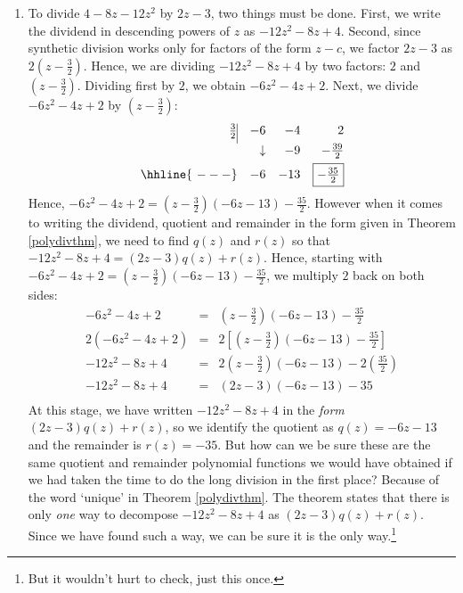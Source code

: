 \documentclass{ximera}
\begin{document}
\begin{exampleSol}
\begin{enumerate}
        \item To divide $4-8z-12z^2$ by $2z-3$, two things must be done.  First, we write the dividend in descending powers of $z$ as $-12z^2-8z+4$.  Second, since synthetic division works only for factors of the form $z-c$, we factor $2z-3$ as $2\left(z-\frac{3}{2}\right)$.  Hence, we are dividing  $-12z^2-8z+4$ by two factors:  $2$ and $\left(z-\frac{3}{2}\right)$.  Dividing first by $2$, we obtain $-6z^2-4z+2$.  Next, we divide  $-6z^2-4z+2$ by $\left(z-\frac{3}{2}\right)$:
            \[ 
                \begin{array}{rrrr}
                    \frac{3}{2}   \vline& -6 & -4 & 2   \\ [4pt]
                    & \downarrow &  -9  & -\frac{39}{2}  \\ [4pt] \hhline{~---} 
                    &  -6  &   -13  & \fbox{$-\frac{35}{2}$}  \\  
                \end{array}
            \]
            Hence,  $-6z^2-4z+2 = \left(z-\frac{3}{2}\right)(-6 z - 13) - \frac{35}{2}$.  However when it comes to writing  the dividend, quotient and remainder in the form given in Theorem \ref{polydivthm}, we need to find $q(z)$ and $r(z)$ so that  $-12z^2-8z+4 = (2z-3) q(z) + r(z)$. Hence, starting with $-6z^2-4z+2 = \left(z-\frac{3}{2}\right)(-6 z - 13) - \frac{35}{2}$, we multiply $2$ back on both sides:  
            \[ 
                \begin{array}{rcl}
                    -6z^2-4z+2  & = & \left(z-\frac{3}{2}\right)(-6 z - 13) - \frac{35}{2}\\
                    2\left(-6z^2-4z+2 \right) & = & 2 \left[ \left(z-\frac{3}{2}\right)(-6 z - 13) - \frac{35}{2} \right] \\
                    -12z^2-8z+4 & = & 2 \left(z-\frac{3}{2}\right)(-6 z - 13) - 2 \left(\frac{35}{2} \right) \\
                    -12z^2-8z+4 & = & (2z-3) (-6 z - 13) - 35  \\ 
                \end{array} 
            \]
            At this stage, we have written $-12z^2-8z+4$ in the \emph{form} $(2z-3) q(z) + r(z)$, so we identify the quotient as  $q(z) = -6z-13$ and the remainder is $r(z) = -35$.  But how can we be sure these are the same quotient and remainder polynomial functions we would have obtained if we had taken the time to do the long division in the first place?   Because of the word   `unique' in Theorem \ref{polydivthm}.  The theorem states that there is only \textit{one} way to decompose $-12z^2-8z+4$ as $(2z-3)q(z) + r(z)$.  Since we have found such a way, we can be sure it is the only way.\footnote{But it wouldn't hurt to check, just this once.}
    \end{enumerate}
\end{exampleSol}
\end{document}
